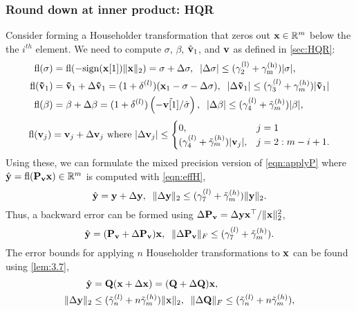 \subsubsection{Round down at inner product: HQR}
Consider forming a Householder transformation that zeros out $\mathbf{x}\in\mathbb{R}^m$ below the the $i^{th}$ element. 
We need to compute $\sigma$, $\beta$, $\tilde{\mathbf{v}}_1$, and $\mathbf{v}$ as defined in \cref{sec:HQR}:
\begin{align}
\fl(\sigma) &= \rm{fl}(-\rm{sign}(\bb{x}[1])\|\bb{x}\|_2) = \sigma + \Delta \sigma,\;\;|\Delta\sigma| \leq (\gamma_{2}^{(l)}+\gamma_{m}^{(h)})|\sigma|,\label{eqn:mpsigma}\\
\fl(\bb{\tilde{v}}_1)& =\bb{\tilde{v}}_1 + \Delta \bb{\tilde{v}}_1 = (1+\dd^{(l)}) (\bb{x}_{1}-\sigma-\Delta\sigma), \;\;|\Delta\bb{\tilde{v}}_1| \leq (\gamma_{3}^{(l)}+\gamma_{m}^{(h)})|\bb{\tilde{v}}_1| \label{eqn:mpv1}\\
\fl(\beta) &= \beta +\Delta \beta= (1+\dd^{(l)})\left(-\tilde{\bb{v}[1]}/\hat{\sigma}\right), \;\; |\Delta\beta| \leq (\gamma_{4}^{(l)}+\tilde{\gamma}_{m}^{(h)})|\beta|, \label{eqn:mpbeta}
\end{align}
\begin{equation}
	\fl(\bb{v}_j)	= \bb{v}_j + \Delta \bb{v}_j\text{ where }|\Delta \bb{v}_j|\leq 
	\begin{cases}
	0,& j=1\\
	(\gamma_{4}^{(l)} + \tilde{\gamma}_{m}^{(h)})|\bb{v}_j|,&j=2:m-i+1.
	\end{cases}  \label{eqn:mpv}
\end{equation}
Using these, we can formulate the mixed precision version of \cref{eqn:applyP} where $\hat{\mathbf{y}}=\mathrm{fl}(\mathbf{P_vx})\in\mathbb{R}^m$ is computed with \cref{eqn:effH},
\begin{equation}
	\hat{\mathbf{y}} = \mathbf{y}+\Delta \mathbf{y},\;\; \|\Delta \mathbf{y}\|_2 \leq (\gamma_7^{(l)} + \tilde{\gamma}_{m}^{(h)})\|\mathbf{y}\|_2.
\end{equation}
Thus, a backward error can be formed using $\Delta \mathbf{P_v} = \Delta \mathbf{y}\mathbf{x}^{
\top}/\|\mathbf{x}\|_2^2$,
\begin{equation}
	\hat{\mathbf{y}} = (\mathbf{P_v} + \Delta \mathbf{P_v})\mathbf{x},\;\; \|\Delta \mathbf{P_v}\|_F\leq (\gamma_7^{(l)} + \tilde{\gamma}_{m}^{(h)}).
\end{equation}
The error bounds for applying $n$ Householder transformations to $\mathbf{x}$ can be found using \cref{lem:3.7},
\begin{align}
\hat{\bb{y}} &= \bb{Q} (\bb{x} +\Delta \bb{x}) = (\bb{Q} + \Delta \bb{Q})\bb{x},\\
\|\Delta \bb{y}\|_2 &\leq (\tilde{\gamma}_n^{(l)}+n\tilde{\gamma}_m^{(h)})\|\bb{x}\|_2,\;\; \|\Delta \bb{Q}\|_F\leq (\tilde{\gamma}_n^{(l)}+n\tilde{\gamma}_m^{(h)}),\label{eqn:mp19.3}
\end{align} 
